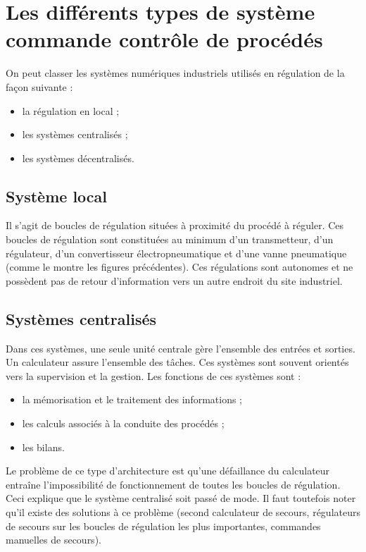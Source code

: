 \section{Les différents types de système commande contrôle de procédés}



On peut classer les systèmes numériques industriels utilisés en régulation de la façon suivante : 

\begin{itemize}
\item  la régulation en local ; 
\item  les systèmes centralisés ;
\item  les systèmes décentralisés. 

\end{itemize}

\subsection{Système local}

Il s’agit de boucles de régulation situées à proximité du procédé à réguler. 
Ces boucles de régulation sont constituées au minimum d’un transmetteur, d’un régulateur, d’un convertisseur électropneumatique et d’une vanne pneumatique (comme le montre les figures précédentes). Ces régulations sont autonomes et ne possèdent pas de retour d’information vers un autre endroit du site industriel. 


\subsection{	Systèmes centralisés }

Dans ces systèmes, une seule unité centrale gère l’ensemble des entrées et sorties. Un calculateur assure l’ensemble des tâches. 
Ces systèmes sont souvent orientés vers la supervision et la gestion. Les fonctions de ces systèmes sont : 

\begin{itemize}
\item  la mémorisation et le traitement des informations ; 
\item  les calculs associés à la conduite des procédés ;
\item  les bilans. 

\end{itemize}

Le problème de ce type d’architecture est qu’une défaillance du calculateur entraîne l’impossibilité de fonctionnement de toutes les boucles de régulation. Ceci explique que le système centralisé soit passé de mode. Il faut toutefois noter qu’il existe des solutions à ce problème (second calculateur de secours, régulateurs de secours sur les boucles de régulation les plus importantes, commandes manuelles de secours). 


